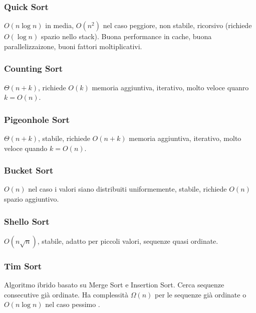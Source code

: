 \subsubsection{Quick Sort}
$O(n\log n)$ in media, $O(n^2)$ nel caso peggiore, non stabile, ricorsivo (richiede $O(\log n)$ spazio nello stack). Buona performance in cache, buona parallelizzaizone, buoni fattori
moltiplicativi. 
\subsubsection{Counting Sort}
$\Theta(n+k)$, richiede $O(k)$ memoria aggiuntiva, iterativo, molto veloce quanro $k= O(n)$.
\subsubsection{Pigeonhole Sort}
$\Theta(n + k)$, stabile, richiede $O(n+k)$ memoria aggiuntiva, iterativo, molto veloce quando $k = O(n)$.
\subsubsection{Bucket Sort}
$O(n)$ nel caso i valori siano distribuiti uniformemente, stabile, richiede $O(n)$ spazio aggiuntivo. 
\subsubsection{Shello Sort}
$O(n\sqrt{n})$, stabile, adatto per piccoli valori, sequenze quasi ordinate. 
\subsubsection{Tim Sort}
Algoritmo ibrido basato su Merge Sort e Insertion Sort. Cerca sequenze consecutive gi\`a ordinate. Ha complessit\`a $\Omega(n)$ per le sequenze gi\`a ordinate o $O(n\log n)$ nel caso
pessimo .
